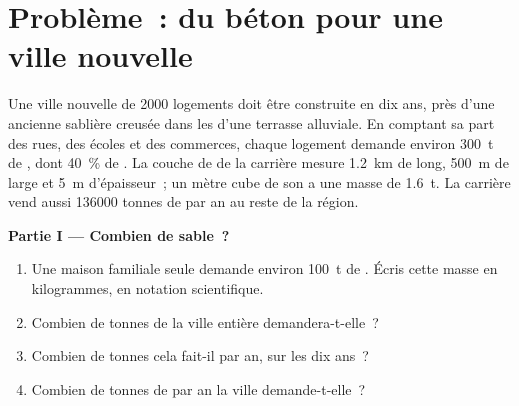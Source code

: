 \section{Problème~: du béton pour une ville nouvelle}

\begin{problem}
\label{pb:g9:earth-resources:1}
Une ville nouvelle de \num{2000} logements doit être construite en dix ans,
près d'une ancienne sablière creusée dans les  d'une terrasse
alluviale. En comptant sa part des rues, des écoles et des commerces,
chaque logement demande environ \qty{300}{t} de , dont
\qty{40}{\%} de . La couche de  de la carrière mesure
\qty{1.2}{km} de long, \qty{500}{m} de large et \qty{5}{m} d'épaisseur~;
un mètre cube de son  a une masse de \qty{1.6}{t}. La carrière vend
aussi \num{136000} tonnes de  par an au reste de la région.

\noindent\textbf{Partie I --- Combien de sable~?}\par\nopagebreak
\begin{enumerate}[beginpenalty=10000]
  \item Une maison familiale seule demande environ \qty{100}{t} de
        . Écris cette masse en kilogrammes, en notation
        scientifique.
  \item Combien de tonnes de  la ville entière demandera-t-elle~?
  \item Combien de tonnes cela fait-il par an, sur les dix ans~?
  \item Combien de tonnes de  par an la ville demande-t-elle~?
\end{enumerate}


\end{problem}
